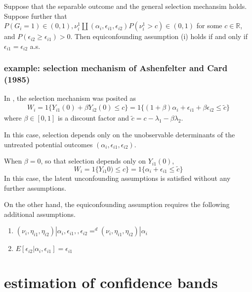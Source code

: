 \documentclass{article}
\begin{document}
 \begin{theorem}
     Suppose that the separable outcome and the general selection mechansim holds. Suppose further that $P(G_i = 1) \in (0,1) , \nu_i^1 \amalg ( \alpha_i , \epsilon_{i1}, \epsilon_{i2} ) P( \nu_i^1 > c) \in (0,1) $ for some $c\in \mathbb{R}$, and $P (\epsilon_{i2} \geq \epsilon_{i1} ) > 0$.
     Then equiconfounding assumption (i) holds if and only if $\epsilon_{i1} = \epsilon_{i2}$ a.s.
 \end{theorem}
 

\subsubsection{example: selection mechanism of Ashenfelter and Card (1985)}
In \cite{ashenfelter and card 19 85} , the selection mechanism was posited as 
\begin{align*}
    W_i = 1\{ Y_{i1}(0) + \beta Y_{i2} ( 0) \leq c \} =  1 \{  (1 + \beta ) \alpha_i + \epsilon_{i1} + \beta \epsilon_{i2} \leq \tilde{c} \}
\end{align*}
where $\beta\in[0,1]$ is a discount factor and $\tilde{c} = c - \lambda_1 - \beta \lambda_2$.

In this case, selection depends only on the unobservable determinants of the untreated potential outcomes $( \alpha_i , \epsilon_{i1}, \epsilon_{i2} ) $.

When $\beta = 0 $, so that selection depends only on $Y_{i1} (0) $, 
\begin{equation}
    W_i = 1 \{ Y_{i1}0) \leq c \} = 1 \{ \alpha_i  + \epsilon_{i1} \leq \tilde{c} \}
\end{equation}
In this case, the latent unconfounding assumptions is satisfied without any further assumptions. 

On the other hand,  the equiconfounding assumption requires the following additional assumptions.
\begin{enumerate}
    \item $ ( \nu_i, \eta_{i1} , \eta_{i2} ) | \alpha_i , \epsilon_{i1}, , \epsilon_{i2} =^d ( \nu_i , \eta_{i1}, \eta_{i2} ) | \alpha_i$
    \item $ E [ \epsilon_{i2} | \alpha_i , \epsilon_{i1} ] = \epsilon_{i1}$
\end{enumerate}





\section{estimation of confidence bands}
\end{document}
